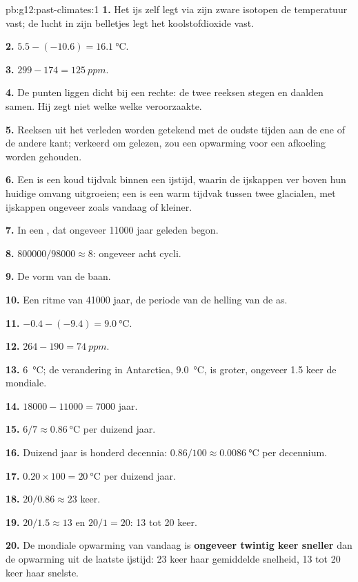 \begin{solution}{pb:g12:past-climates:1}
\textbf{1.} Het ijs zelf legt via zijn zware isotopen de
temperatuur vast; de lucht in zijn belletjes legt het koolstofdioxide vast.

\textbf{2.} $5.5 - (-10.6) = \qty{16.1}{\degreeCelsius}$.

\textbf{3.} $299 - 174 = \qty{125}{ppm}$.

\textbf{4.} De punten liggen dicht bij een rechte: de twee reeksen stegen
en daalden samen. Hij zegt niet welke welke veroorzaakte.

\textbf{5.} Reeksen uit het verleden worden getekend met de oudste tijden aan de ene of de andere
kant; verkeerd om gelezen, zou een opwarming voor een afkoeling worden gehouden.

\textbf{6.} Een  is een koud tijdvak binnen een ijstijd, waarin de
ijskappen ver boven hun huidige omvang uitgroeien; een  is een warm
tijdvak tussen twee glacialen, met ijskappen ongeveer zoals vandaag of
kleiner.

\textbf{7.} In een , dat ongeveer \num{11000} jaar geleden begon.

\textbf{8.} $\num{800000}/\num{98000} \approx 8$: ongeveer acht cycli.

\textbf{9.} De vorm van de baan.

\textbf{10.} Een ritme van \num{41000} jaar, de periode van de helling van de
as.

\textbf{11.} $-0.4 - (-9.4) = \qty{9.0}{\degreeCelsius}$.

\textbf{12.} $264 - 190 = \qty{74}{ppm}$.

\textbf{13.} \qty{6}{\degreeCelsius}; de verandering in Antarctica, \qty{9.0}{\degreeCelsius},
is groter, ongeveer 1.5 keer de mondiale.

\textbf{14.} $\num{18000} - \num{11000} = \num{7000}$ jaar.

\textbf{15.} $6/7 \approx \qty{0.86}{\degreeCelsius}$ per duizend jaar.

\textbf{16.} Duizend jaar is honderd decennia: $0.86/100 \approx
\qty{0.0086}{\degreeCelsius}$ per decennium.

\textbf{17.} $0.20 \times 100 = \qty{20}{\degreeCelsius}$ per duizend jaar.

\textbf{18.} $20/0.86 \approx 23$ keer.

\textbf{19.} $20/1.5 \approx 13$ en $20/1 = 20$: 13 tot 20 keer.

\textbf{20.} De mondiale opwarming van vandaag is \textbf{ongeveer twintig keer sneller} dan
de opwarming uit de laatste ijstijd: 23 keer haar gemiddelde snelheid, 13 tot 20 keer
haar snelste.
\end{solution}
